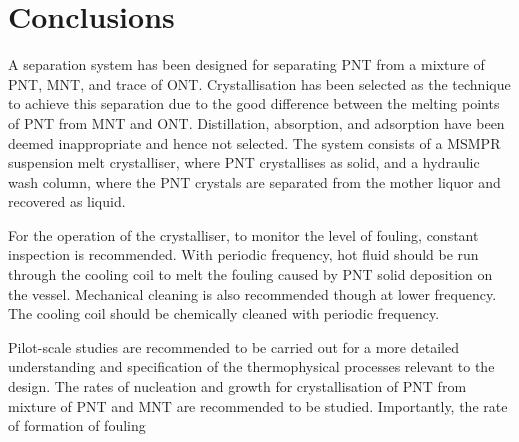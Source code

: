 \section{Conclusions}\label{separation conclusions}

A separation system has been designed for separating PNT from a mixture of PNT, MNT, and trace of ONT. Crystallisation has been selected as the technique to achieve this separation due to the good difference between the melting points of PNT from MNT and ONT. Distillation, absorption, and adsorption have been deemed inappropriate and hence not selected. The system consists of a MSMPR suspension melt crystalliser, where PNT crystallises as solid, and a hydraulic wash column, where the PNT crystals are separated from the mother liquor and recovered as liquid. 

For the operation of the crystalliser, to monitor the level of fouling, constant inspection is recommended. With periodic frequency, hot fluid should be run through the cooling coil to melt the fouling caused by PNT solid deposition on the vessel. Mechanical cleaning is also recommended though at lower frequency. The cooling coil should be chemically cleaned with periodic frequency.

Pilot-scale studies are recommended to be carried out for a more detailed understanding and specification of the thermophysical processes relevant to the design. The rates of nucleation and growth for crystallisation of PNT from mixture of PNT and MNT are recommended to be studied. Importantly, the rate of formation of fouling 